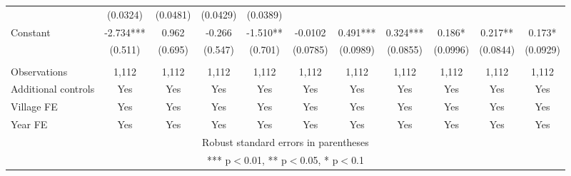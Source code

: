 \documentclass[]{article}
\begin{document}
\begin{tabular}{lcccccccccc}
 & (0.0324) & (0.0481) & (0.0429) & (0.0389) &  &  &  &  &  &  \\
Constant & -2.734*** & 0.962 & -0.266 & -1.510** & -0.0102 & 0.491*** & 0.324*** & 0.186* & 0.217** & 0.173* \\
 & (0.511) & (0.695) & (0.547) & (0.701) & (0.0785) & (0.0989) & (0.0855) & (0.0996) & (0.0844) & (0.0929) \\
 &  &  &  &  &  &  &  &  &  &  \\
Observations & 1,112 & 1,112 & 1,112 & 1,112 & 1,112 & 1,112 & 1,112 & 1,112 & 1,112 & 1,112 \\
Additional controls & Yes & Yes & Yes & Yes & Yes & Yes & Yes & Yes & Yes & Yes \\
Village FE & Yes & Yes & Yes & Yes & Yes & Yes & Yes & Yes & Yes & Yes \\
 Year FE & Yes & Yes & Yes & Yes & Yes & Yes & Yes & Yes & Yes & Yes \\ \hline
\multicolumn{11}{c}{ Robust standard errors in parentheses} \\
\multicolumn{11}{c}{ *** p$<$0.01, ** p$<$0.05, * p$<$0.1} \\
\end{tabular}
\end{document}
